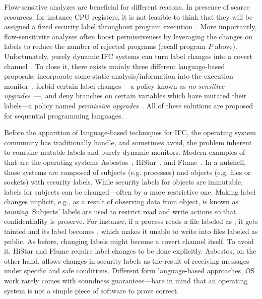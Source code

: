 
Flow-sensitive analyzes are beneficial for different reasons. In presence of
scarce resources, for instance CPU registers, it is not feasible to think that
they will be assigned a fixed security label throughout program
execution~\citep{BonelliCM05}. More importantly, flow-sensitivite analyses often
boost permissiveness by leveraging the changes on labels to reduce the number of
rejected programs (recall program $P$ above). Unfortunately, purely dynamic IFC
systems can turn label changes into a covert channel~\citep{Russo:2010}. To
close it, there exists mainly three different language-based proposals:
incorporate some static analysis/information into the execution
monitor~\citep{Russo:2010,stefan:lio,10.1109/SP.2013.10}, forbid certain label
changes ---a policy known as \emph{no-sensitive
  upgrades}~\citep{Austin:Flanagan:PLAS10}---, and deny branches on certain
variables which have mutated their labels---a policy named \emph{permissive
  upgrades}~\citep{Austin:Flanagan:PLAS10}. All of these solutions are proposed
for sequential programming languages.


Before the apparition of language-based techniques for IFC, the operating system
community has traditionally handle, and sometimes avoid, the problem inherent to
combine mutable labels and purely dynamic monitors. Modern examples of that are
the operating systems Asbestos~\citep{Efstathopoulos:2005},
HiStar~\citep{zeldovich:histar}, and Flume~\citep{krohn:flume}. In a nutshell,
those systems are composed of subjects (e.g. processes) and objects (e.g. files
or sockets) with security labels. While security labels for objects are
immutable, labels for subjects can be changed---often by a more restrictive
one. Making label changes implicit, e.g., as a result of observing data from
object, is known as \emph{tainting}. Subjects' labels are used to restrict read
and write actions so that confidentiality is preserve. For instance, if a
process reads a file labeled as \high, it gets tainted and its label becomes
\high, which makes it unable to write into files labeled as public. As before,
changing labels might become a covert channel itself. To avoid it, HiStar and
Flume require label changes to be done explicitly.  Asbestos, on the other hand,
allows changes in security labels as the result of receiving messages under
specific and safe conditions. Different form language-based approaches, OS work
rarely comes with soundness guarantees---bare in mind that an operating system
is not a simple piece of software to prove correct.


